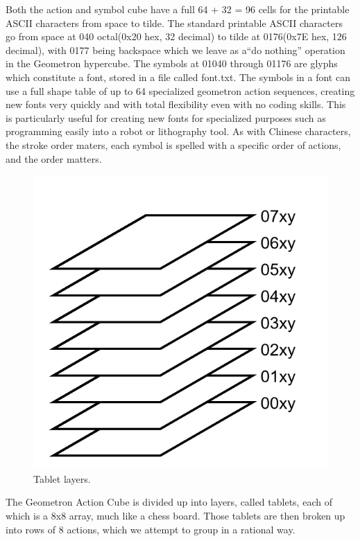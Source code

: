 \documentclass[11pt]{article}
\begin{document}
    Both the action and symbol cube have a full 64 + 32 = 96 cells for the printable ASCII characters from space to tilde.  The standard printable ASCII characters go from space at 040 octal(0x20 hex, 32 decimal) to tilde at 0176(0x7E hex, 126 decimal), with 0177 being backspace which we leave as a``do nothing'' operation in the Geometron hypercube. The symbols at 01040 through 01176 are glyphs which constitute a font, stored in a file called font.txt.  The symbols in a font can use a full shape table of up to 64 specialized geometron action sequences, creating new fonts very quickly and with total flexibility even with no coding skills.  This is particularly useful for creating new fonts for specialized purposes such as programming easily into a robot or lithography tool. As with Chinese characters, the stroke order maters, each symbol is spelled with a specific order of actions, and the order matters.   


\begin{figure}
\includegraphics{figures/fig2cubestack.png}
\caption{Tablet layers.}
\end{figure}

    The Geometron Action Cube is divided up into layers, called tablets, each of which is a 8x8 array, much like a chess board.  Those tablets are then broken up into rows of 8 actions, which we attempt to group in a rational way.   
\end{document}
